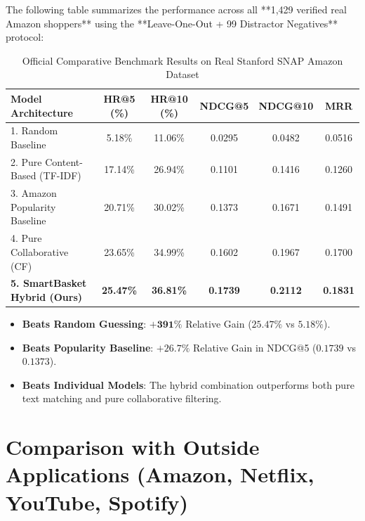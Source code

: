 \documentclass[11pt,a4paper]{article}
\begin{document}
The following table summarizes the performance across all **1,429 verified real Amazon shoppers** using the **Leave-One-Out + 99 Distractor Negatives** protocol:

\begin{table}[h!]
\centering
\small
\begin{tabular}{lccccc}
\toprule
\textbf{Model Architecture} & \textbf{HR@5 (\%)} & \textbf{HR@10 (\%)} & \textbf{NDCG@5} & \textbf{NDCG@10} & \textbf{MRR} \\
\midrule
1. Random Baseline & 5.18\% & 11.06\% & 0.0295 & 0.0482 & 0.0516 \\
2. Pure Content-Based (TF-IDF) & 17.14\% & 26.94\% & 0.1101 & 0.1416 & 0.1260 \\
3. Amazon Popularity Baseline & 20.71\% & 30.02\% & 0.1373 & 0.1671 & 0.1491 \\
4. Pure Collaborative (CF) & 23.65\% & 34.99\% & 0.1602 & 0.1967 & 0.1700 \\
\textbf{5. SmartBasket Hybrid (Ours)} & \textbf{25.47\%} & \textbf{36.81\%} & \textbf{0.1739} & \textbf{0.2112} & \textbf{0.1831} \\
\bottomrule
\end{tabular}
\caption{Official Comparative Benchmark Results on Real Stanford SNAP Amazon Dataset}
\end{table}

\begin{tcolorbox}[title=Summary of Gains on Genuine Human Data]
\begin{itemize}[noitemsep]
    \item \textbf{Beats Random Guessing}: $\mathbf{+391\%}$ Relative Gain ($25.47\%$ vs $5.18\%$).
    \item \textbf{Beats Popularity Baseline}: $\mathbf{+26.7\%}$ Relative Gain in NDCG@5 ($0.1739$ vs $0.1373$).
    \item \textbf{Beats Individual Models}: The hybrid combination outperforms both pure text matching and pure collaborative filtering.
\end{itemize}
\end{tcolorbox}

\section{Comparison with Outside Applications (Amazon, Netflix, YouTube, Spotify)}
\end{document}
